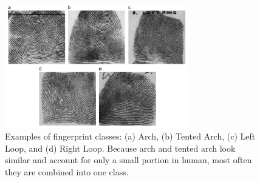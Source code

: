 \begin{figure}[!ht]
	\begin{center}
		\includegraphics[width=8cm]{fig/Fingerprint_classes.png}
	\end{center}
	\caption{Examples of fingerprint classes\cite{cao2013fingerprint}: (a) Arch, (b) Tented Arch,  (c) Left Loop, and  (d) Right Loop.  Because arch and tented arch look similar and account for only a small portion in human, most often they are combined into one class.} 
	\label{fig.fingerprint_classes}
\end{figure}

